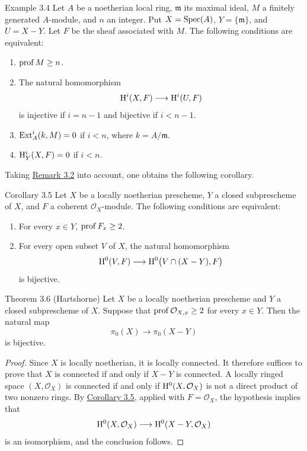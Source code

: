 \begin{sgastatement}{Example 3.4}
Let $A$ be a noetherian local ring, $\mathfrak m$ its maximal ideal, $M$ a
finitely generated $A$-module, and $n$ an integer. Put
$X=\operatorname{Spec}(A)$, $Y=\{\mathfrak m\}$, and $U=X-Y$. Let $F$ be the sheaf associated
with $M$. The following conditions are equivalent:
\begin{enumerate}[label=\textup{(\arabic*)},leftmargin=2.8em]
\item $\operatorname{prof} M\ge n$.
\item The natural homomorphism
\[
  \mathrm H^i(X,F)\longrightarrow\mathrm H^i(U,F)
\]
is injective if $i=n-1$ and bijective if $i<n-1$.
\item $\operatorname{Ext}_A^i(k,M)=0$ if $i<n$, where $k=A/\mathfrak m$.
\item $\mathrm H_Y^i(X,F)=0$ if $i<n$.
\end{enumerate}
\end{sgastatement}

Taking \hyperref[III.3.2]{Remark 3.2} into account, one obtains the following corollary.


\begin{sgastatement}{Corollary 3.5}
Let $X$ be a locally noetherian prescheme, $Y$ a closed subprescheme of $X$,
and $F$ a coherent $\mathcal O_X$-module. The following conditions are equivalent:
\begin{enumerate}[label=\textup{(\arabic*)},leftmargin=2.8em]
\item For every $x\in Y$, $\operatorname{prof} F_x\ge2$.
\item For every open subset $V$ of $X$, the natural homomorphism
\[
  \mathrm H^0(V,F)\longrightarrow\mathrm H^0\bigl(V\cap(X-Y),F\bigr)
\]
is bijective.
\end{enumerate}
\end{sgastatement}

\begin{sgastatement}{Theorem 3.6 (Hartshorne)}
Let $X$ be a locally noetherian prescheme and $Y$ a closed subprescheme of
$X$. Suppose that $\operatorname{prof}\mathcal O_{X,x}\ge2$ for every $x\in Y$. Then the
natural map
\[
  \pi_0(X)\longrightarrow\pi_0(X-Y)
\]
is bijective.
\end{sgastatement}

\begin{proof}
Since $X$ is locally noetherian, it is locally connected. It therefore
suffices to prove that $X$ is connected if and only if $X-Y$ is connected.
A locally ringed space $(X,\mathcal O_X)$ is connected if and only if
$\mathrm H^0(X,\mathcal O_X)$ is not a direct product of two nonzero rings. By
\hyperref[III.3.5]{Corollary 3.5}, applied with $F=\mathcal O_X$, the hypothesis implies that
\[
  \mathrm H^0(X,\mathcal O_X)\longrightarrow
  \mathrm H^0(X-Y,\mathcal O_X)
\]
is an isomorphism, and the conclusion follows.
\end{proof}


